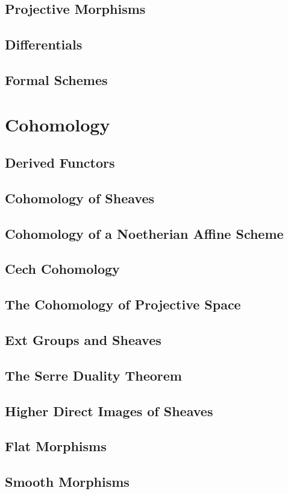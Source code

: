 \subsection{Projective Morphisms}
\subsection{Differentials}
\subsection{Formal Schemes}

\section{Cohomology}
\subsection{Derived Functors}
\subsection{Cohomology of Sheaves}
\subsection{Cohomology of a Noetherian Affine Scheme}
\subsection{Cech Cohomology}
\subsection{The Cohomology of Projective Space}
\subsection{Ext Groups and Sheaves}
\subsection{The Serre Duality Theorem}
\subsection{Higher Direct Images of Sheaves}
\subsection{Flat Morphisms}
\subsection{Smooth Morphisms}
